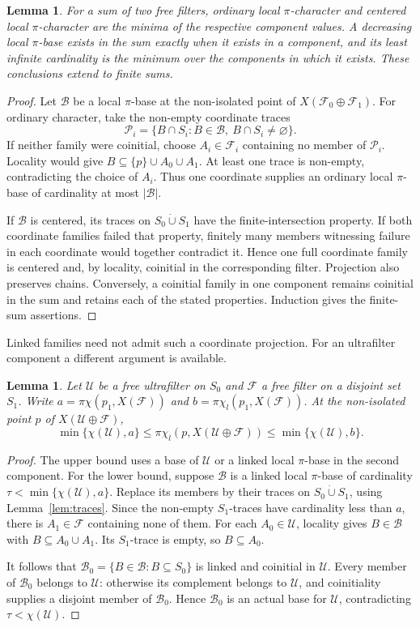 \documentclass[11pt,a4paper]{amsart}
\newtheorem{lemma}[theorem]{Lemma}
\theoremstyle{definition}
\theoremstyle{remark}
\newcommand{\U}{\mathcal U}
\newcommand{\F}{\mathcal F}
\newcommand{\B}{\mathcal B}
\newcommand{\pc}{\pi\chi}
\newcommand{\pcl}{\pi\chi_l}
\begin{document}
\begin{lemma}\label{lem:sum}
For a sum of two free filters, ordinary local $\pi$-character and centered local $\pi$-character are the minima of the respective component values. A decreasing local $\pi$-base exists in the sum exactly when it exists in a component, and its least infinite cardinality is the minimum over the components in which it exists. These conclusions extend to finite sums.
\end{lemma}
\begin{proof}
Let $\B$ be a local $\pi$-base at the non-isolated point of $X(\F_0\oplus\F_1)$. For ordinary character, take the non-empty coordinate traces
\[
\mathcal P_i=\{B\cap S_i:B\in\B,\ B\cap S_i\ne\varnothing\}.
\]
If neither family were coinitial, choose $A_i\in\F_i$ containing no member of $\mathcal P_i$. Locality would give $B\subseteq\{p\}\cup A_0\cup A_1$. At least one trace is non-empty, contradicting the choice of $A_i$. Thus one coordinate supplies an ordinary local $\pi$-base of cardinality at most $|\B|$.

If $\B$ is centered, its traces on $S_0\mathbin{\dot\cup}S_1$ have the finite-intersection property. If both coordinate families failed that property, finitely many members witnessing failure in each coordinate would together contradict it. Hence one full coordinate family is centered and, by locality, coinitial in the corresponding filter. Projection also preserves chains. Conversely, a coinitial family in one component remains coinitial in the sum and retains each of the stated properties. Induction gives the finite-sum assertions.
\end{proof}

Linked families need not admit such a coordinate projection. For an ultrafilter component a different argument is available.

\begin{lemma}\label{lem:ultra-linked}
Let $\U$ be a free ultrafilter on $S_0$ and $\F$ a free filter on a disjoint set $S_1$. Write $a=\pc(p_1,X(\F))$ and $b=\pcl(p_1,X(\F))$. At the non-isolated point $p$ of $X(\U\oplus\F)$,
\[
\min\{\chi(\U),a\}\leqslant\pcl(p,X(\U\oplus\F))
\leqslant\min\{\chi(\U),b\}.
\]
\end{lemma}
\begin{proof}
The upper bound uses a base of $\U$ or a linked local $\pi$-base in the second component. For the lower bound, suppose $\B$ is a linked local $\pi$-base of cardinality $\tau<\min\{\chi(\U),a\}$. Replace its members by their traces on $S_0\mathbin{\dot\cup}S_1$, using Lemma~\ref{lem:traces}. Since the non-empty $S_1$-traces have cardinality less than $a$, there is $A_1\in\F$ containing none of them. For each $A_0\in\U$, locality gives $B\in\B$ with $B\subseteq A_0\cup A_1$. Its $S_1$-trace is empty, so $B\subseteq A_0$.

It follows that $\B_0=\{B\in\B:B\subseteq S_0\}$ is linked and coinitial in $\U$. Every member of $\B_0$ belongs to $\U$: otherwise its complement belongs to $\U$, and coinitiality supplies a disjoint member of $\B_0$. Hence $\B_0$ is an actual base for $\U$, contradicting $\tau<\chi(\U)$.
\end{proof}
\end{document}
